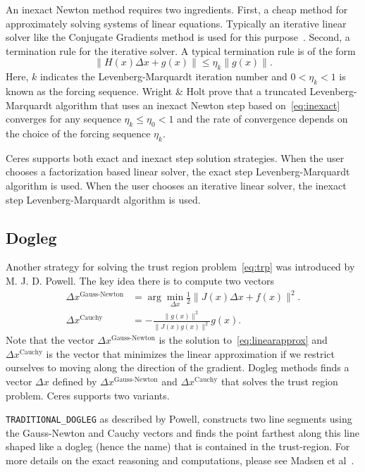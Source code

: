 An inexact Newton method requires two ingredients. First, a cheap method for approximately solving systems of linear equations. Typically an iterative linear solver like the Conjugate Gradients method is used for this purpose~\cite{nocedal2000numerical}. Second, a termination rule for the iterative solver. A typical termination rule is of the form
\begin{equation}
        \|H(x) \Delta x + g(x)\| \leq \eta_k \|g(x)\|. \label{eq:inexact}
\end{equation}
Here, $k$ indicates the Levenberg-Marquardt iteration number and $0 < \eta_k <1$ is known as the forcing sequence.  Wright \& Holt \cite{wright1985inexact} prove that a truncated Levenberg-Marquardt algorithm that uses an inexact Newton step based on~\eqref{eq:inexact} converges for any sequence $\eta_k \leq \eta_0 < 1$ and the rate of convergence depends on the choice of the forcing sequence $\eta_k$.

Ceres supports both exact and inexact step solution strategies. When the user chooses a factorization based linear solver, the exact step Levenberg-Marquardt algorithm is used. When the user chooses an iterative linear solver, the inexact step Levenberg-Marquardt algorithm is used.

\subsection{Dogleg}
Another strategy for solving the trust region problem~\eqref{eq:trp} was introduced by M. J. D. Powell. The key idea there is to compute two vectors
\begin{align}
        \Delta x^{\text{Gauss-Newton}} &= \arg \min_{\Delta x}\frac{1}{2} \|J(x)\Delta x + f(x)\|^2.\\
        \Delta x^{\text{Cauchy}} &= -\frac{\|g(x)\|^2}{\|J(x)g(x)\|^2}g(x).
\end{align}
Note that the vector $\Delta x^{\text{Gauss-Newton}}$ is the solution
to~\eqref{eq:linearapprox} and $\Delta x^{\text{Cauchy}}$ is the
vector that minimizes the linear approximation if we restrict
ourselves to moving along the direction of the gradient. Dogleg methods finds a vector $\Delta x$ defined by $\Delta
x^{\text{Gauss-Newton}}$ and $\Delta x^{\text{Cauchy}}$ that solves
the trust region problem. Ceres supports two
variants.

\texttt{TRADITIONAL\_DOGLEG} as described by Powell,
constructs two line segments using the Gauss-Newton and Cauchy vectors
and finds the point farthest along this line shaped like a dogleg
(hence the name) that is contained in the
trust-region. For more details on the exact reasoning and computations, please see Madsen et al~\cite{madsen2004methods}.

